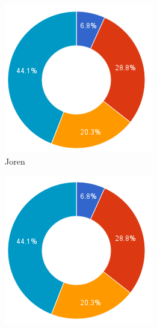 \documentclass[i1]{oss}
\begin{document}
\begin{figure}[h!]
        \centering
        \begin{subfigure}[hb]{0.20\textwidth}
                \centering
                \includegraphics[width=\textwidth]{chart_2}
                \caption{Joren}
        \end{subfigure}%
        \begin{subfigure}[hb]{0.20\textwidth}
                \centering
                \includegraphics[width=\textwidth]{chart_3}

\end{subfigure}
\end{figure}
\end{document}
